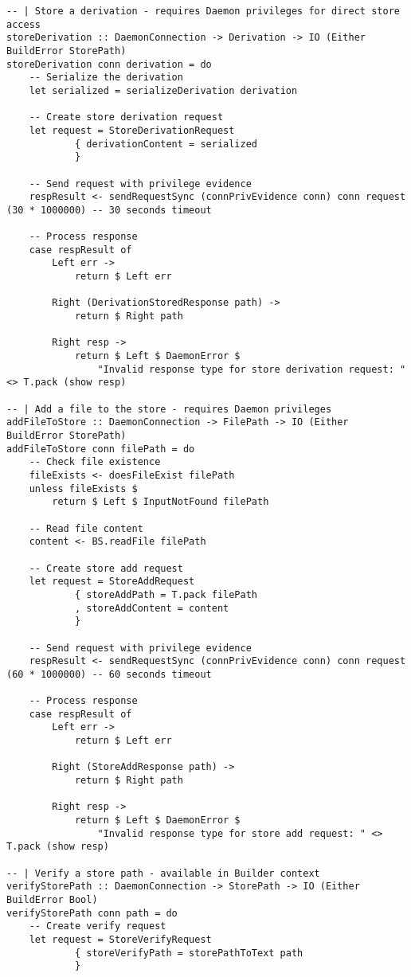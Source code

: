 \documentclass{article}
\begin{document}
\begin{tcolorbox}[title=Ten/Daemon/Client.hs Changes]
\begin{verbatim}
-- | Store a derivation - requires Daemon privileges for direct store access
storeDerivation :: DaemonConnection -> Derivation -> IO (Either BuildError StorePath)
storeDerivation conn derivation = do
    -- Serialize the derivation
    let serialized = serializeDerivation derivation

    -- Create store derivation request
    let request = StoreDerivationRequest
            { derivationContent = serialized
            }

    -- Send request with privilege evidence
    respResult <- sendRequestSync (connPrivEvidence conn) conn request (30 * 1000000) -- 30 seconds timeout

    -- Process response
    case respResult of
        Left err ->
            return $ Left err

        Right (DerivationStoredResponse path) ->
            return $ Right path

        Right resp ->
            return $ Left $ DaemonError $
                "Invalid response type for store derivation request: " <> T.pack (show resp)

-- | Add a file to the store - requires Daemon privileges
addFileToStore :: DaemonConnection -> FilePath -> IO (Either BuildError StorePath)
addFileToStore conn filePath = do
    -- Check file existence
    fileExists <- doesFileExist filePath
    unless fileExists $
        return $ Left $ InputNotFound filePath

    -- Read file content
    content <- BS.readFile filePath

    -- Create store add request
    let request = StoreAddRequest
            { storeAddPath = T.pack filePath
            , storeAddContent = content
            }

    -- Send request with privilege evidence
    respResult <- sendRequestSync (connPrivEvidence conn) conn request (60 * 1000000) -- 60 seconds timeout

    -- Process response
    case respResult of
        Left err ->
            return $ Left err

        Right (StoreAddResponse path) ->
            return $ Right path

        Right resp ->
            return $ Left $ DaemonError $
                "Invalid response type for store add request: " <> T.pack (show resp)

-- | Verify a store path - available in Builder context
verifyStorePath :: DaemonConnection -> StorePath -> IO (Either BuildError Bool)
verifyStorePath conn path = do
    -- Create verify request
    let request = StoreVerifyRequest
            { storeVerifyPath = storePathToText path
            }


\end{verbatim}
\end{tcolorbox}
\end{document}
